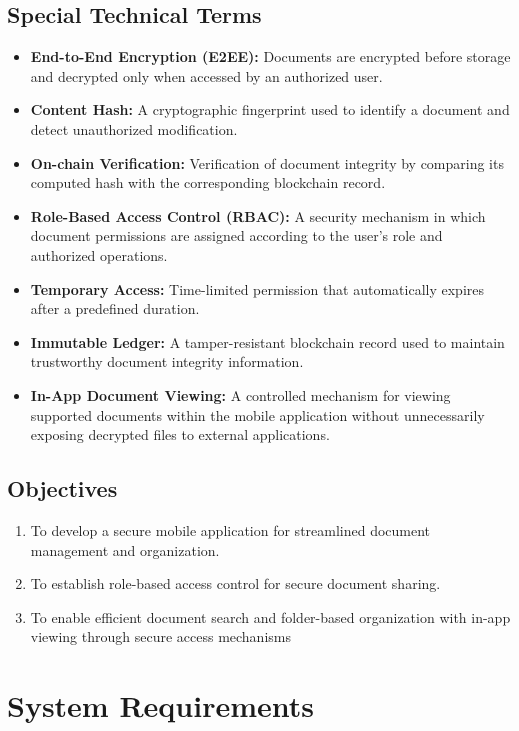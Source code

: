 \documentclass[12pt]{article}
\begin{document}
\subsection{Special Technical Terms}
\begin{itemize}
\item \textbf{End-to-End Encryption (E2EE):} Documents are encrypted before storage and decrypted only when accessed by an authorized user.
\item \textbf{Content Hash:} A cryptographic fingerprint used to identify a document and detect unauthorized modification.
\item \textbf{On-chain Verification:} Verification of document integrity by comparing its computed hash with the corresponding blockchain record.
\item \textbf{Role-Based Access Control (RBAC):} A security mechanism in which document permissions are assigned according to the user's role and authorized operations.
\item \textbf{Temporary Access:} Time-limited permission that automatically expires after a predefined duration.
\item \textbf{Immutable Ledger:} A tamper-resistant blockchain record used to maintain trustworthy document integrity information.
\item \textbf{In-App Document Viewing:} A controlled mechanism for viewing supported documents within the mobile application without unnecessarily exposing decrypted files to external applications.
\end{itemize}


\subsection{Objectives}

\begin{enumerate}
    \item To develop a secure mobile application for streamlined document management and organization.
    
    \item To establish role-based access control for secure document sharing.
    
   \item To enable efficient document search and folder-based organization with in-app viewing through secure access mechanisms
\end{enumerate}


\newpage
\section{System Requirements}
\end{document}
